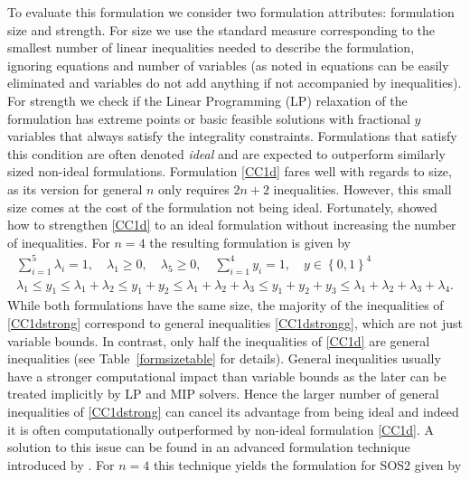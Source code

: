 \documentclass[mnsc]{informs3}
\newcommand{\set}[1]{\left\{#1\right\}}                     %
\begin{document}
To evaluate this formulation we consider two formulation attributes: formulation size and strength. For size we use the standard measure corresponding to the smallest number of linear inequalities needed to describe the formulation, ignoring equations and number of variables (as noted in \cite{Kaibel11} equations can be easily eliminated and variables do not add anything if not accompanied by inequalities). For strength we check if the Linear Programming (LP) relaxation of the formulation has extreme points or basic feasible solutions with fractional $y$ variables that always satisfy the integrality constraints. Formulations that satisfy this condition are often denoted \emph{ideal} and are expected to outperform similarly sized non-ideal formulations. Formulation \eqref{CC1d} fares well with regards to size, as its version for general $n$ only requires $2n+2$ inequalities. However, this small size comes at the cost of the formulation not being ideal. Fortunately, \cite{padberg00} showed how to strengthen \eqref{CC1d} to an ideal formulation without increasing the number of inequalities. For $n=4$ the resulting formulation is given by 
\begin{subequations}\label{CC1dstrong}
\begin{alignat}{3}
\sum\nolimits_{i=1}^5 \lambda_i=1,\quad \lambda_1\geq 0,\quad\lambda_5 \geq 0, \quad\sum\nolimits_{i=1}^4 y_i=1,\quad y\in \set{0,1}^4\\
\lambda_1\leq y_1\leq \lambda_1+\lambda_2\leq y_1+y_2\leq \lambda_1+\lambda_2+\lambda_3\leq y_1+y_2+y_3\leq \lambda_1+\lambda_2+\lambda_3+\lambda_4.\label{CC1dstrongg}
\end{alignat}
\end{subequations}
While both formulations have the same size, the majority of the inequalities of \eqref{CC1dstrong} correspond to general inequalities \eqref{CC1dstrongg}, which are not just variable bounds. In contrast, only half the inequalities of \eqref{CC1d} are general inequalities (see Table~\ref{formsizetable} for details). General inequalities usually have a stronger computational impact than variable bounds as the later can be treated implicitly by LP and MIP solvers. Hence the larger number of general inequalities of  \eqref{CC1dstrong} can cancel its advantage from being ideal and indeed it is often  computationally outperformed by non-ideal formulation \eqref{CC1d}. A solution to this issue can be found in an advanced  formulation technique introduced by  \cite{Modeling-Disjunctive-Constraints-FULL}. For $n=4$ this technique yields the formulation for SOS2 given by
\end{document}
